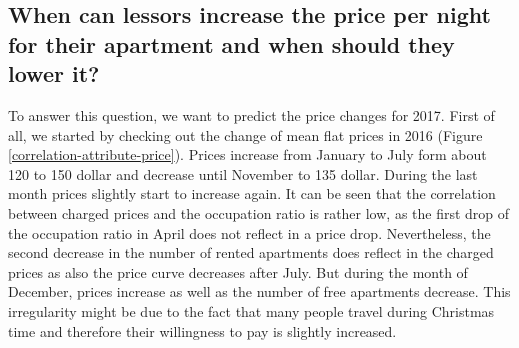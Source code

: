 \documentclass[journal]{IEEEtran}
\begin{document}
\subsection{When can lessors increase the price per night for their apartment and when should they lower it?}
\noindent To answer this question, we want to predict the price changes for 2017. First of all, we started by checking out the change of mean flat prices in 2016 (Figure \ref{correlation-attribute-price}). 
Prices increase from January to July form about 120 to 150 dollar and decrease until November to 135 dollar. During the last month prices slightly start to increase again. It can be seen that the correlation between charged prices and the occupation ratio is rather low, as the first drop of the occupation ratio in April does not reflect in a price drop. Nevertheless, the second decrease in the number of rented apartments does reflect in the charged prices as also the price curve decreases after July. But during the month of December, prices increase as well as the number of free apartments decrease. This irregularity might be due to the fact that many people travel during Christmas time and therefore their willingness to pay is slightly increased. 
\end{document}
